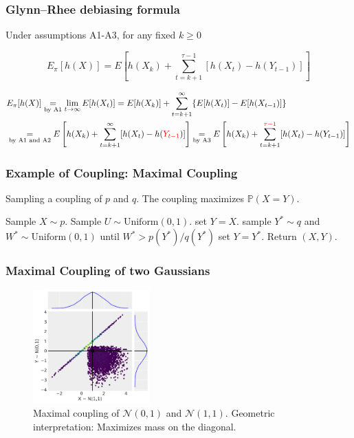 \begin{frame}
	\frametitle{Glynn--Rhee debiasing formula}
	\begin{theorem}
		Under assumptions A1-A3, for any fixed $k \geq 0$

		\[
			E_\pi[h(X)]  =E[h(X_k) + \sum_{t=k+1}^{\tau-1} [h(X_t) - h(Y_{t-1})] ]
		\]
	\end{theorem}

	\begin{align*}
		 & E_\pi[h(X)] \underset{\text{by A1}}{=} \lim_{t \to \infty} E[h(X_t)] = E[h(X_k)] + \sum_{t=k+1}^{\infty} \{E[h(X_t)] - E[h(X_{t-1})]\} \\
		 & \underset{\text{by A1 and A2}}{=} E\left[h(X_k) + \sum_{t=k+1}^{\infty} [h(X_t) - h(\textcolor{red}{Y_{t-1}})]\right]
		\underset{\text{by A3}}{=} E\left[h(X_k) + \sum_{t=k+1}^{\textcolor{red}{\tau-1}} [h(X_t) - h(Y_{t-1})]\right]
	\end{align*}

\end{frame}

\begin{frame}
	\frametitle{Example of Coupling: Maximal Coupling}
	\begin{algorithm}[H]
		\caption{Sampling a coupling of $p$ and $q$. The coupling maximizes $\mathbb{P}(X = Y)$.}
		\begin{algorithmic}[1]
			\STATE Sample $X \sim p$.
			\STATE Sample $U \sim \text{Uniform}(0, 1)$.
			\STATE set $Y = X$.
			\ELSE
			\STATE sample $Y^* \sim q$ and $W^* \sim \text{Uniform}(0, 1)$ until $W^* > p(Y^*)/q(Y^*)$
			\ENDWHILE
			\STATE set $Y = Y^*$.
			\ENDIF
			\STATE Return $(X, Y)$.
		\end{algorithmic}
	\end{algorithm}
\end{frame}

\begin{frame}
	\frametitle{Maximal Coupling of two Gaussians}
	\begin{figure}[h]
		\centering
		\includegraphics[width=0.4\textwidth]{maximal_coupling_plot.pdf}
		\caption{Maximal coupling of $\mathcal{N}(0, 1)$ and $\mathcal{N}(1, 1)$. Geometric interpretation: Maximizes mass on the diagonal.}
	\end{figure}
\end{frame}


